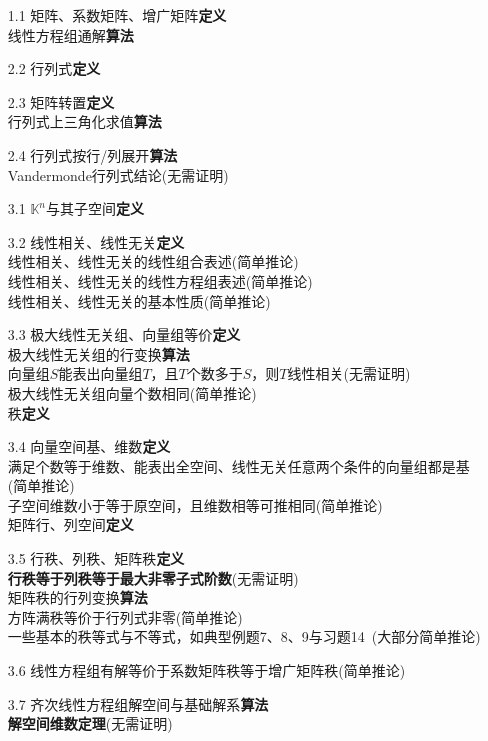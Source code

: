 \documentclass[a4paper,UTF8,fontset=windows,AutoFakeBold]{ctexart}
\begin{document}
\begin{enumerate}
    \item[1.1] 矩阵、系数矩阵、增广矩阵\textbf{定义}
    \\线性方程组通解\textbf{算法}
    \item[2.2] 行列式\textbf{定义}
    \item[2.3] 矩阵转置\textbf{定义}
    \\行列式上三角化求值\textbf{算法}
    \item[2.4] 行列式按行/列展开\textbf{算法}
    \\Vandermonde行列式结论(无需证明)
    \item[3.1] $\mathbb{K}^n$与其子空间\textbf{定义}
    \item[3.2] 线性相关、线性无关\textbf{定义}
    \\线性相关、线性无关的线性组合表述(简单推论)
    \\线性相关、线性无关的线性方程组表述(简单推论)
    \\线性相关、线性无关的基本性质(简单推论)
    \item[3.3] 极大线性无关组、向量组等价\textbf{定义}
    \\极大线性无关组的行变换\textbf{算法}
    \\向量组$S$能表出向量组$T$，且$T$个数多于$S$，则$T$线性相关(无需证明)
    \\极大线性无关组向量个数相同(简单推论)
    \\秩\textbf{定义}
    \item[3.4] 向量空间基、维数\textbf{定义}
    \\满足个数等于维数、能表出全空间、线性无关任意两个条件的向量组都是基(简单推论)
    \\子空间维数小于等于原空间，且维数相等可推相同(简单推论)
    \\矩阵行、列空间\textbf{定义}
    \item[3.5] 行秩、列秩、矩阵秩\textbf{定义}
    \\\textbf{行秩等于列秩等于最大非零子式阶数}(无需证明)
    \\矩阵秩的行列变换\textbf{算法}
    \\方阵满秩等价于行列式非零(简单推论)
    \\一些基本的秩等式与不等式，如典型例题7、8、9与习题14\ (大部分简单推论)
    \item[3.6] 线性方程组有解等价于系数矩阵秩等于增广矩阵秩(简单推论)
    \item[3.7] 齐次线性方程组解空间与基础解系\textbf{算法}
    \\\textbf{解空间维数定理}(无需证明)

\end{enumerate}
\end{document}
